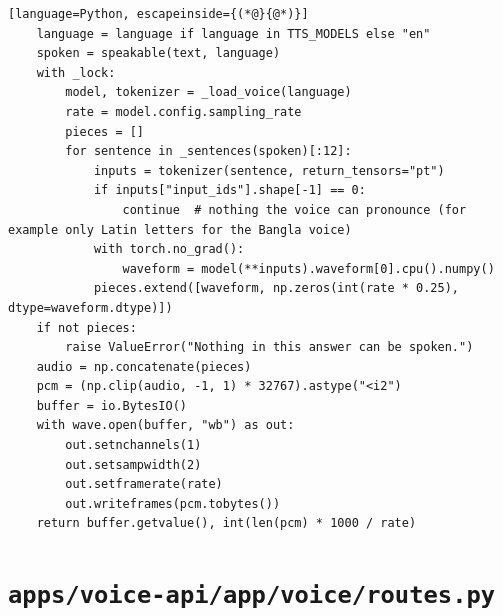 \begin{lstlisting}[language=Python, escapeinside={(*@}{@*)}]
    language = language if language in TTS_MODELS else "en"
    spoken = speakable(text, language)
    with _lock:
        model, tokenizer = _load_voice(language)
        rate = model.config.sampling_rate
        pieces = []
        for sentence in _sentences(spoken)[:12]:
            inputs = tokenizer(sentence, return_tensors="pt")
            if inputs["input_ids"].shape[-1] == 0:
                continue  # nothing the voice can pronounce (for example only Latin letters for the Bangla voice)
            with torch.no_grad():
                waveform = model(**inputs).waveform[0].cpu().numpy()
            pieces.extend([waveform, np.zeros(int(rate * 0.25), dtype=waveform.dtype)])
    if not pieces:
        raise ValueError("Nothing in this answer can be spoken.")
    audio = np.concatenate(pieces)
    pcm = (np.clip(audio, -1, 1) * 32767).astype("<i2")
    buffer = io.BytesIO()
    with wave.open(buffer, "wb") as out:
        out.setnchannels(1)
        out.setsampwidth(2)
        out.setframerate(rate)
        out.writeframes(pcm.tobytes())
    return buffer.getvalue(), int(len(pcm) * 1000 / rate)
\end{lstlisting}

\section*{\normalsize\nolinkurl{apps/voice-api/app/voice/routes.py}}

